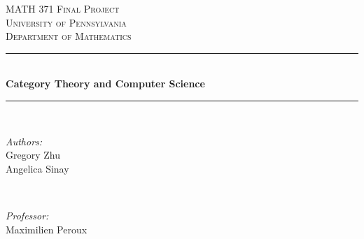 \begin{titlepage}

\newcommand{\HRule}{\rule{\linewidth}{0.5mm}} %

 

\center %


\textsc{\LARGE MATH 371 Final Project}\\[1.5cm] %
\textsc{\Large University of Pennsylvania}\\[0.5cm] %
\textsc{\large Department of Mathematics}\\[0.5cm] %

\makeatletter
\HRule \\[0.4cm]
{ \huge \bfseries Category Theory and Computer Science}\\[0.4cm] %
\HRule \\[1.5cm]
 

\begin{minipage}{0.4\textwidth}
\begin{flushleft} \large
\emph{Authors:}\\
Gregory Zhu \\ %
Angelica Sinay
\end{flushleft}
\end{minipage}
~
\begin{minipage}{0.4\textwidth}
\begin{flushright} \large
\emph{Professor:} \\
Maximilien Peroux \\[1.2em] %
\end{flushright}
\end{minipage}\\[2cm]
\makeatother


\end{titlepage}
